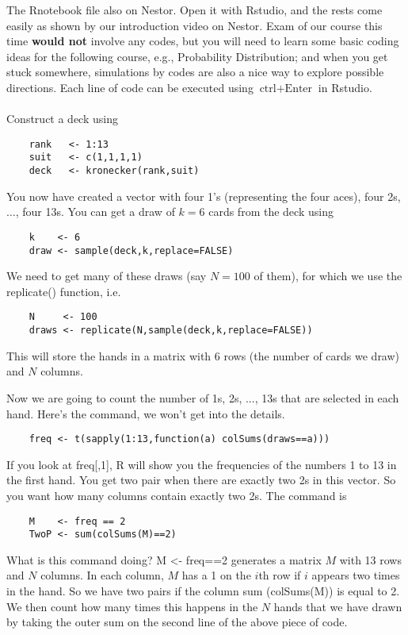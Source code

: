\begin{exercise}
The Rnotebook file also on Nestor. Open it with Rstudio, and the rests come easily as shown by our introduction video on Nestor. Exam of our course this time \textbf{would not} involve any codes, but you will need to learn some basic coding ideas for the following course, e.g., Probability Distribution; and when you get stuck somewhere, simulations by codes are also a nice way to explore possible directions. \newline\newline
Each line of code can be executed using $\text{ctrl}+\text{Enter}$ in Rstudio.  
~\\~\\
Construct a deck using
\begin{verbatim}
	rank   <- 1:13  
	suit   <- c(1,1,1,1)
	deck   <- kronecker(rank,suit)
\end{verbatim}
You now have created a vector with four 1's (representing the four aces), four 2s, $\ldots$, four 13s. You can get a draw of $k=6$ cards from the deck using 
\begin{verbatim}
	k    <- 6
	draw <- sample(deck,k,replace=FALSE)
\end{verbatim}
We need to get many of these draws (say $N=100$ of them), for which we use the {replicate()} function, i.e.
\begin{verbatim}
	N     <- 100
	draws <- replicate(N,sample(deck,k,replace=FALSE))
\end{verbatim}
This will store the hands in a matrix with 6 rows (the number of cards we draw) and $N$ columns.

Now we are going to count the number of 1s, 2s, ..., 13s that are selected in each hand. Here's the command, we won't get into the details.
\begin{verbatim}
	freq <- t(sapply(1:13,function(a) colSums(draws==a)))
\end{verbatim}
If you look at  {freq[,1]}, R will show you the frequencies of the numbers 1 to 13 in the first hand. You get two pair when there are exactly two 2s in this vector. So you want how many columns contain exactly two 2s. The command is
\begin{verbatim}
	M    <- freq == 2
	TwoP <- sum(colSums(M)==2)
\end{verbatim}
What is this command doing? {M <- freq==2} generates a matrix $M$ with 13 rows and $N$ columns. In each column, $M$ has a 1 on the $i$th row if $i$ appears two times in the hand. So we have two pairs if the column sum ({colSums(M)}) is equal to 2. We then count how many times this happens in the $N$ hands that we have drawn by taking the outer {sum} on the second line of the above piece of code.  


\end{exercise}

